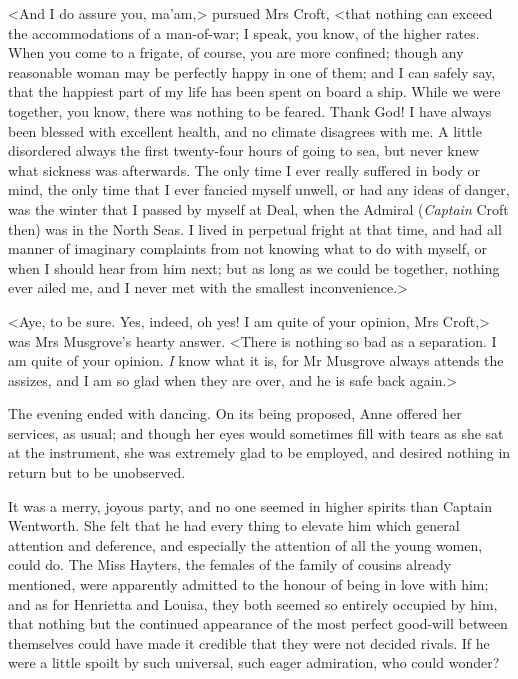 <And I do assure you, ma'am,> pursued Mrs Croft, <that nothing can exceed the accommodations of a man-of-war; I speak, you know, of the higher rates. When you come to a frigate, of course, you are more confined; though any reasonable woman may be perfectly happy in one of them; and I can safely say, that the happiest part of my life has been spent on board a ship. While we were together, you know, there was nothing to be feared. Thank God! I have always been blessed with excellent health, and no climate disagrees with me. A little disordered always the first twenty-four hours of going to sea, but never knew what sickness was afterwards. The only time I ever really suffered in body or mind, the only time that I ever fancied myself unwell, or had any ideas of danger, was the winter that I passed by myself at Deal, when the Admiral (\textit{Captain} Croft then) was in the North Seas. I lived in perpetual fright at that time, and had all manner of imaginary complaints from not knowing what to do with myself, or when I should hear from him next; but as long as we could be together, nothing ever ailed me, and I never met with the smallest inconvenience.>

<Aye, to be sure. Yes, indeed, oh yes! I am quite of your opinion, Mrs Croft,> was Mrs Musgrove's hearty answer. <There is nothing so bad as a separation. I am quite of your opinion. \textit{I} know what it is, for Mr Musgrove always attends the assizes, and I am so glad when they are over, and he is safe back again.>

The evening ended with dancing. On its being proposed, Anne offered her services, as usual; and though her eyes would sometimes fill with tears as she sat at the instrument, she was extremely glad to be employed, and desired nothing in return but to be unobserved.

It was a merry, joyous party, and no one seemed in higher spirits than Captain Wentworth. She felt that he had every thing to elevate him which general attention and deference, and especially the attention of all the young women, could do. The Miss Hayters, the females of the family of cousins already mentioned, were apparently admitted to the honour of being in love with him; and as for Henrietta and Louisa, they both seemed so entirely occupied by him, that nothing but the continued appearance of the most perfect good-will between themselves could have made it credible that they were not decided rivals. If he were a little spoilt by such universal, such eager admiration, who could wonder?

